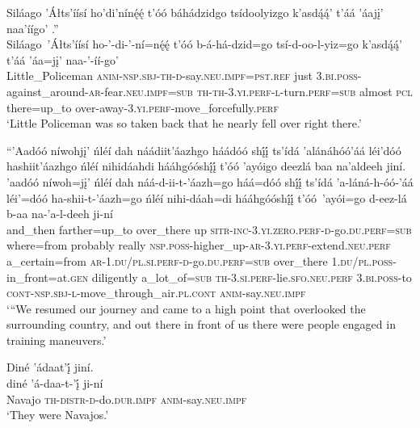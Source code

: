 \ea\label{ex:text2-16-6}
Siláago ’Áłts’íísí ho’di’nínę́ę́ t’óó báhádzidgo tsídoolyizgo k’asdą́ą́’ t’áá ’áajį’ naa’íígo’ .''\\
\gll Siláago~{’Áłts’íísí}	ho-’-di-’-ní=nę́ę́	t’óó	b-á-há-dzid=go	tsí-d-oo-l-yiz=go	k’asdą́ą́’	t’áá	’áa=jį’	naa-’-íí-go’\\
     Little\_Policeman	\textsc{anim}-\textsc{nsp}.\textsc{sbj}-\textsc{th}-\textsc{d}-say.\textsc{neu}.\textsc{impf}=\textsc{pst}.\textsc{ref}	just	3.\textsc{bi}.\textsc{poss}-against\_around-\textsc{ar}-fear.\textsc{neu}.\textsc{impf}=\textsc{sub}	\textsc{th}-\textsc{th}-3.\textsc{yi}.\textsc{perf}-\textsc{l}-turn.\textsc{perf}=\textsc{sub}	almost	\textsc{pcl}	there=up\_to	over-away-3.\textsc{yi}.\textsc{perf}-move\_forcefully.\textsc{perf}\\
\glt `Little Policeman was so taken back that he nearly fell over right there.'
\z

\ea\label{ex:text2-17-1}
``’Aadóó níwohjį’ ńléí dah náádiit’áazhgo háádóó shį́į́ ts’ídá ’alánáhóó’áá léi’dóó hashiit’áazhgo ńléí nihidáahdi hááhgóóshį́į́ t’óó ’ayóigo deezlá baa na’aldeeh jiní.\\
\gll ’aadóó	níwoh=jį’	ńléí	dah	náá-d-ii-t-’áazh=go	háá=dóó	shį́į́	ts’ídá	’a-láná-h-óó-’áá	léi’=dóó	ha-shii-t-’áazh=go	ńléí	nihi-dáah=di	hááhgóóshį́į́	t’óó~{’ayói=go}	d-eez-lá	b-aa	na-’a-l-deeh	ji-ní\\
     and\_then	farther=up\_to	over\_there	up	\textsc{sitr}-\textsc{inc}-3.\textsc{yi}.\textsc{zero}.\textsc{perf}-\textsc{d}-go.\textsc{du}.\textsc{perf}=\textsc{sub}	where=from	probably	really	\textsc{nsp}.\textsc{poss}-higher\_up-\textsc{ar}-3.\textsc{yi}.\textsc{perf}-extend.\textsc{neu}.\textsc{perf}	a\_certain=from	\textsc{ar}-1.\textsc{du}/\textsc{pl}.\textsc{si}.\textsc{perf}-\textsc{d}-go.\textsc{du}.\textsc{perf}=\textsc{sub}	over\_there	1.\textsc{du}/\textsc{pl}.\textsc{poss}-in\_front=at.\textsc{gen}	diligently	a\_lot\_of=\textsc{sub}	\textsc{th}-3.\textsc{si}.\textsc{perf}-lie.\textsc{sfo}.\textsc{neu}.\textsc{perf}	3.\textsc{bi}.\textsc{poss}-to	\textsc{cont}-\textsc{nsp}.\textsc{sbj}-\textsc{l}-move\_through\_air.\textsc{pl}.\textsc{cont}	\textsc{anim}-say.\textsc{neu}.\textsc{impf}\\
\glt `{``}We resumed our journey and came to a high point that overlooked the surrounding country, and out there in front of us there were people engaged in training maneuvers.'
\z

\ea\label{ex:text2-17-2}
Diné ’ádaat’į́ jiní.\\
\gll diné	’á-daa-t-’į́	ji-ní\\
     Navajo	\textsc{th}-\textsc{distr}-\textsc{d}-do.\textsc{dur}.\textsc{impf}	\textsc{anim}-say.\textsc{neu}.\textsc{impf}\\
\glt `They were Navajos.'
\z

